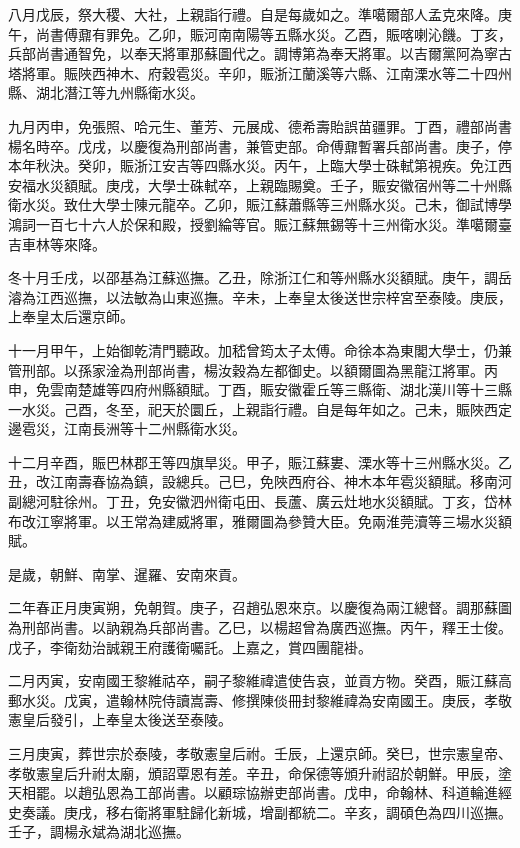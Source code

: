 \begin{pinyinscope}
八月戊辰，祭大稷、大社，上親詣行禮。自是每歲如之。準噶爾部人孟克來降。庚午，尚書傅鼐有罪免。乙卯，賑河南南陽等五縣水災。乙酉，賑喀喇沁饑。丁亥，兵部尚書通智免，以奉天將軍那蘇圖代之。調博第為奉天將軍。以吉爾黨阿為寧古塔將軍。賑陜西神木、府穀雹災。辛卯，賑浙江蘭溪等六縣、江南溧水等二十四州縣、湖北潛江等九州縣衛水災。

九月丙申，免張照、哈元生、董芳、元展成、德希壽貽誤苗疆罪。丁酉，禮部尚書楊名時卒。戊戌，以慶復為刑部尚書，兼管吏部。命傅鼐暫署兵部尚書。庚子，停本年秋決。癸卯，賑浙江安吉等四縣水災。丙午，上臨大學士硃軾第視疾。免江西安福水災額賦。庚戌，大學士硃軾卒，上親臨賜奠。壬子，賑安徽宿州等二十州縣衛水災。致仕大學士陳元龍卒。乙卯，賑江蘇蕭縣等三州縣水災。己未，御試博學鴻詞一百七十六人於保和殿，授劉綸等官。賑江蘇無錫等十三州衛水災。準噶爾臺吉車林等來降。

冬十月壬戌，以邵基為江蘇巡撫。乙丑，除浙江仁和等州縣水災額賦。庚午，調岳濬為江西巡撫，以法敏為山東巡撫。辛未，上奉皇太後送世宗梓宮至泰陵。庚辰，上奉皇太后還京師。

十一月甲午，上始御乾清門聽政。加嵇曾筠太子太傅。命徐本為東閣大學士，仍兼管刑部。以孫家淦為刑部尚書，楊汝穀為左都御史。以額爾圖為黑龍江將軍。丙申，免雲南楚雄等四府州縣額賦。丁酉，賑安徽霍丘等三縣衛、湖北漢川等十三縣一水災。己酉，冬至，祀天於圜丘，上親詣行禮。自是每年如之。己未，賑陜西定邊雹災，江南長洲等十二州縣衛水災。

十二月辛酉，賑巴林郡王等四旗旱災。甲子，賑江蘇婁、溧水等十三州縣水災。乙丑，改江南壽春協為鎮，設總兵。己巳，免陜西府谷、神木本年雹災額賦。移南河副總河駐徐州。丁丑，免安徽泗州衛屯田、長蘆、廣云灶地水災額賦。丁亥，岱林布改江寧將軍。以王常為建威將軍，雅爾圖為參贊大臣。免兩淮莞瀆等三場水災額賦。

是歲，朝鮮、南掌、暹羅、安南來貢。

二年春正月庚寅朔，免朝賀。庚子，召趙弘恩來京。以慶復為兩江總督。調那蘇圖為刑部尚書。以訥親為兵部尚書。乙巳，以楊超曾為廣西巡撫。丙午，釋王士俊。戊子，李衛劾治誠親王府護衛囑託。上嘉之，賞四團龍褂。

二月丙寅，安南國王黎維祜卒，嗣子黎維禕遣使告哀，並貢方物。癸酉，賑江蘇高郵水災。戊寅，遣翰林院侍讀嵩壽、修撰陳倓冊封黎維禕為安南國王。庚辰，孝敬憲皇后發引，上奉皇太後送至泰陵。

三月庚寅，葬世宗於泰陵，孝敬憲皇后祔。壬辰，上還京師。癸巳，世宗憲皇帝、孝敬憲皇后升祔太廟，頒詔覃恩有差。辛丑，命保德等頒升祔詔於朝鮮。甲辰，塗天相罷。以趙弘恩為工部尚書。以顧琮協辦吏部尚書。戊申，命翰林、科道輪進經史奏議。庚戌，移右衛將軍駐歸化新城，增副都統二。辛亥，調碩色為四川巡撫。壬子，調楊永斌為湖北巡撫。


\end{pinyinscope}
